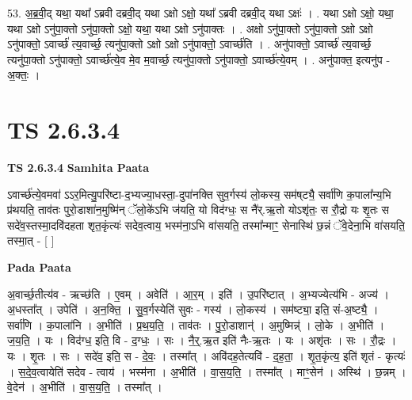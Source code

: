 \documentclass[17pt]{extarticle}
\begin{document}
53. अ॒ब्र॒वी॒द् यथा॒ यथा᳚ ऽब्रवी दब्रवी॒द् यथा ऽक्षो ऽक्षो॒ यथा᳚ ऽब्रवी दब्रवी॒द् यथा ऽक्षः॑ । . यथा ऽक्षो ऽक्षो॒ यथा॒ यथा ऽक्षो ऽनु॑पा॒क्तो ऽनु॑पा॒क्तो ऽक्षो॒ यथा॒ यथा ऽक्षो ऽनु॑पाक्तः । . अक्षो ऽनु॑पा॒क्तो ऽनु॑पा॒क्तो ऽक्षो ऽक्षो ऽनु॑पाक्तो॒ ऽवार्च्छ॑ त्य॒वार्च्छ॒ त्यनु॑पा॒क्तो ऽक्षो ऽक्षो ऽनु॑पाक्तो॒ ऽवार्च्छ॑ति । . अनु॑पाक्तो॒ ऽवार्च्छ॑ त्य॒वार्च्छ॒ त्यनु॑पा॒क्तो ऽनु॑पाक्तो॒ ऽवार्च्छ॑त्ये॒व मे॒व म॒वार्च्छ॒ त्यनु॑पा॒क्तो ऽनु॑पाक्तो॒ ऽवार्च्छ॑त्ये॒वम् । . अनु॑पाक्त॒ इत्यनु॑प - अ॒क्तः॒ । \newline
\pagebreak
{}
\section*{ TS 2.6.3.4 }

\textbf{TS 2.6.3.4 } \newline
\textbf{Samhita Paata} \newline

ऽवार्च्छ॑त्ये॒वमवा॑ ऽऽर॒मित्यु॒परि॑ष्टा-द॒भ्यज्या॒धस्ता॒-दुपा॑नक्ति सुव॒र्गस्य॑ लो॒कस्य॒ सम॑ष्‌ट्यै॒ सर्वा॑णि क॒पाला᳚न्य॒भि प्र॑थयति॒ ताव॑तः पुरो॒डाशा॑न॒मुष्मि॑न् ॅलो॒के॑ऽभि ज॑यति॒ यो विद॑ग्धः॒ स नै॑र्.ऋ॒तो योऽशृ॑तः॒ स रौ॒द्रो यः शृ॒तः स सदे॑व॒स्तस्मा॒दवि॑दहता शृत॒कृंत्यः॑ सदेव॒त्वाय॒ भस्म॑ना॒ऽभि वा॑सयति॒ तस्मा᳚न्माꣳ॒॒ सेनास्थि॑ छ॒न्नं ॅवे॒देना॒भि वा॑सयति॒ तस्मा॒त् - [  ] \newline

\textbf{Pada Paata} \newline

अ॒वार्च्छ॒तीत्य॑व - ऋच्छ॑ति । ए॒वम् । अवेति॑ । आ॒र॒म् । इति॑ । उ॒परि॑ष्टात् । अ॒भ्यज्येत्य॑भि - अज्य॑ । अ॒धस्ता᳚त् । उपेति॑ । अ॒न॒क्ति॒ । सु॒व॒र्गस्येति॑ सुवः - गस्य॑ । लो॒कस्य॑ । सम॑ष्ट्या॒ इति॒ सं-अ॒ष्ट्यै॒ । सर्वा॑णि । क॒पाला॑नि । अ॒भीति॑ । प्र॒थ॒य॒ति॒ । ताव॑तः । पु॒रो॒डाशान्॑ । अ॒मुष्मिन्न्॑ । लो॒के । अ॒भीति॑ । ज॒य॒ति॒ । यः । विद॑ग्ध॒ इति॒ वि - द॒ग्धः॒ । सः । नै॒र्॒.ऋ॒त इति॑ नैः-ऋ॒तः । यः । अशृ॑तः । सः । रौ॒द्रः । यः । शृ॒तः । सः । सदे॑व॒ इति॒ स - दे॒वः॒ । तस्मा᳚त् । अवि॑दह॒तेत्यवि॑ - द॒ह॒ता॒ । शृ॒त॒कृंत्य॒ इति॑ शृतं - कृत्यः॑ । स॒दे॒व॒त्वायेति॑ सदेव - त्वाय॑ । भस्म॑ना । अ॒भीति॑ । वा॒स॒य॒ति॒ । तस्मा᳚त् । माꣳ॒॒सेन॑ । अस्थि॑ । छ॒न्नम् । वे॒देन॑ । अ॒भीति॑ । वा॒स॒य॒ति॒ । तस्मा᳚त् ।  \newline
\end{document}
